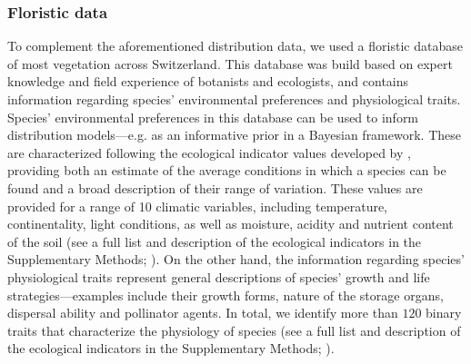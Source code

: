 \documentclass[11pt, a4paper]{article}
\begin{document}
\subsubsection*{Floristic data}
To complement the aforementioned distribution data, we used a floristic database of most vegetation across Switzerland. This database was build based on expert knowledge and field experience of botanists and ecologists, and contains information regarding species' environmental preferences and physiological traits. Species' environmental preferences in this database can be used to inform distribution models---e.g. as an informative prior in a Bayesian framework. These are characterized following the ecological indicator values developed by \citet{landoltFloraIndicativaOkologische2010}, providing both an estimate of the average conditions in which a species can be found and a broad description of their range of variation. These values are provided for a range of 10 climatic variables, including temperature, continentality, light conditions, as well as moisture, acidity and nutrient content of the soil (see a full list and description of the ecological indicators in the Supplementary Methods; \citealt{landoltFloraIndicativaOkologische2010}). On the other hand, the information regarding species' physiological traits represent general descriptions of species' growth and life strategies---examples include their growth forms, nature of the storage organs, dispersal ability and pollinator agents. In total, we identify more than $120$ binary traits that characterize the physiology of species (see a full list and description of the ecological indicators in the Supplementary Methods; \citealt{landoltFloraIndicativaOkologische2010}).  


\end{document}
